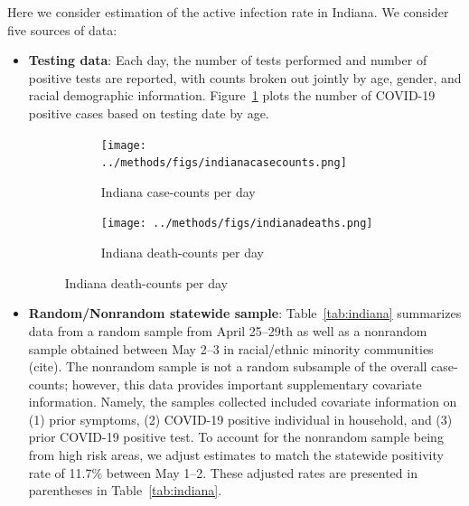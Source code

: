 \documentclass[12pt]{amsart}
\numberwithin{equation}{section}
\theoremstyle{plain}
\begin{document}

Here we consider estimation of the active infection rate in Indiana. We consider five sources of data:
\begin{itemize}[leftmargin=*]
\item {\bf Testing data}:  Each day, the number of tests performed and number of positive tests are reported, with counts broken out jointly by age, gender, and racial demographic information.  Figure~\ref{fig:in-cases} plots the number of COVID-19 positive cases based on testing date by age.

\begin{figure}
\centering
\begin{subfigure}{.45\textwidth}
  \centering
  \texttt{[image: ../methods/figs/indianacasecounts.png]}
  \caption{Indiana case-counts per day}
  \label{fig:in-cases}
\end{subfigure}
\begin{subfigure}{.45\textwidth}
  \centering
  \texttt{[image: ../methods/figs/indianadeaths.png]}
  \caption{Indiana death-counts per day}
  \label{fig:in-deaths}
\end{subfigure}
\end{figure}

\item {\bf Random/Nonrandom statewide sample}: Table~\ref{tab:indiana} summarizes data from a random sample from April 25--29th as well as a nonrandom sample obtained between May 2--3 in racial/ethnic minority communities (cite). The nonrandom sample is not a random subsample of the overall case-counts; however, this data provides important supplementary covariate information.  Namely, the samples collected included covariate information on (1) prior symptoms, (2) COVID-19 positive individual in household, and (3) prior COVID-19 positive test. To account for the nonrandom sample being from high risk areas, we adjust estimates to match the statewide positivity rate of 11.7\% between May 1--2. These adjusted rates are presented in parentheses in Table~\ref{tab:indiana}.



\end{itemize}
\end{document}
